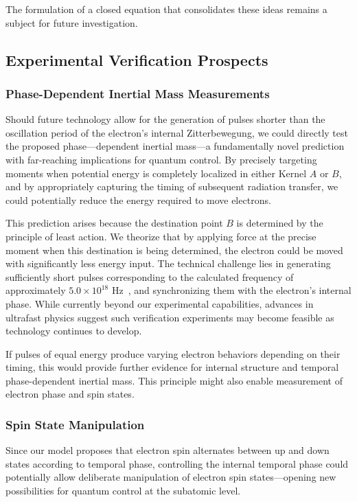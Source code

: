 \documentclass[%
 reprint,
 amsmath,amssymb,
 aps,
]{revtex4-1}
\numberwithin{equation}{section}%
\begin{document}
The formulation of a closed equation that consolidates these ideas remains a subject for future investigation.

\subsection{Experimental Verification Prospects}

\subsubsection{Phase-Dependent Inertial Mass Measurements}
Should future technology allow for the generation of pulses shorter than the oscillation period of the electron’s internal Zitterbewegung, we could directly test the proposed phase---dependent inertial mass---a fundamentally novel prediction with far-reaching implications for quantum control. By precisely targeting moments when potential energy is completely localized in either Kernel $A$ or $B$, and by appropriately capturing the timing of subsequent radiation transfer, we could potentially reduce the energy required to move electrons.

This prediction arises because the destination point $B$ is determined by the principle of least action. We theorize that by applying force at the precise moment when this destination is being determined, the electron could be moved with significantly less energy input. The technical challenge lies in generating sufficiently short pulses corresponding to the calculated frequency of approximately $5.0 \times 10^{18}$ Hz~\cite{hanamura2023}, and synchronizing them with the electron's internal phase. While currently beyond our experimental capabilities, advances in ultrafast physics suggest such verification experiments may become feasible as technology continues to develop.

If pulses of equal energy produce varying electron behaviors depending on their timing, this would provide further evidence for internal structure and temporal phase-dependent inertial mass. This principle might also enable measurement of electron phase and spin states.

\subsubsection{Spin State Manipulation}
Since our model proposes that electron spin alternates between up and down states according to temporal phase, controlling the internal temporal phase could potentially allow deliberate manipulation of electron spin states—opening new possibilities for quantum control at the subatomic level.
\end{document}
